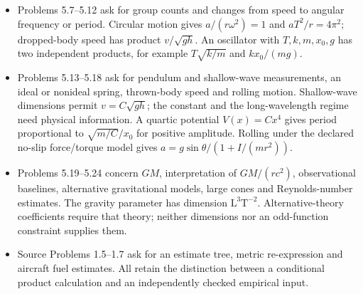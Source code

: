 \begin{itemize}
budget estimate, energy versus power optima, lift coefficients, geometric
flight scaling, air density, a migrating-bird comparison, thermal resistance
and a housefly's power. The geometric model gives
\(v_E\propto m^{1/6}\rho^{-1/2}\).
With hover-power model \(P\propto(mg)^{3/2}/(\sqrt\rho L)\),
\(P/m\propto L^{1/2}\) for similar constant-density bodies.
A thermal-resistance comparison requires thickness divided by conductivity
and area. Population, prices, observed speeds and material data remain inputs,
not dimensional conclusions.
\item Problems 5.7--5.12 ask for group counts and changes from speed to
angular frequency or period. Circular motion gives \(a/(r\omega^2)=1\)
and \(aT^2/r=4\pi^2\); dropped-body speed has product \(v/\sqrt{gh}\).
An oscillator with \(T,k,m,x_0,g\) has two independent products, for example
\(T\sqrt{k/m}\) and \(kx_0/(mg)\).
\item Problems 5.13--5.18 ask for pendulum and shallow-wave measurements,
an ideal or nonideal spring, thrown-body speed and rolling motion.
Shallow-wave dimensions permit \(v=C\sqrt{gh}\); the constant and the
long-wavelength regime need physical information.
A quartic potential \(V(x)=Cx^4\) gives period proportional to
\(\sqrt{m/C}/x_0\) for positive amplitude. Rolling under the declared
no-slip force/torque model gives \(a=g\sin\theta/(1+I/(mr^2))\).
\item Problems 5.19--5.24 concern \(GM\), interpretation of
\(GM/(rc^2)\), observational baselines, alternative gravitational models,
large cones and Reynolds-number estimates. The gravity parameter has
dimension \(\mathrm L^3\mathrm T^{-2}\).
Alternative-theory coefficients require that theory; neither dimensions
nor an odd-function constraint supplies them.
\item Source Problems 1.5--1.7 ask for an estimate tree, metric re-expression
and aircraft fuel estimates. All retain the distinction between a conditional
product calculation and an independently checked empirical input.
\end{itemize}
\cite[1.3--1.5, 4.1--4.7, 5.1--5.3]{Mahajan2014Insight}

